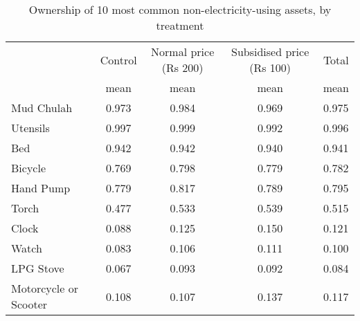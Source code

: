 \begin{table}[htbp]\centering
\def\sym#1{\ifmmode^{#1}\else\(^{#1}\)\fi}
\caption{Ownership of 10 most common non-electricity-using assets, by treatment \label{tab:"label"}}
\begin{tabular*}{0.9\hsize}{@{\hskip\tabcolsep\extracolsep\fill}l*{4}{c}}
\toprule
                                &  Control&Normal price (Rs 200)&Subsidised price (Rs 100)&    Total\\
                                &     mean&     mean&     mean&     mean\\
\midrule
Mud Chulah                      &    0.973&    0.984&    0.969&    0.975\\
Utensils                        &    0.997&    0.999&    0.992&    0.996\\
Bed                             &    0.942&    0.942&    0.940&    0.941\\
Bicycle                         &    0.769&    0.798&    0.779&    0.782\\
Hand Pump                       &    0.779&    0.817&    0.789&    0.795\\
Torch                           &    0.477&    0.533&    0.539&    0.515\\
Clock                           &    0.088&    0.125&    0.150&    0.121\\
Watch                           &    0.083&    0.106&    0.111&    0.100\\
LPG Stove                       &    0.067&    0.093&    0.092&    0.084\\
Motorcycle or Scooter           &    0.108&    0.107&    0.137&    0.117\\
\bottomrule
\end{tabular*}
\end{table}
